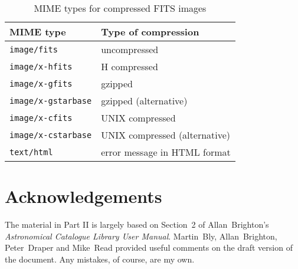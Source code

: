 \documentclass[twoside,11pt]{article}
\renewcommand{\_}{\texttt{\symbol{95}}}
\begin{document}
\begin{table}[htbp]

\begin{center}
\begin{tabular}{ll}
MIME type                & Type of compression   \\ \hline
{\tt image/fits}         & uncompressed          \\
{\tt image/x-hfits}      & H compressed          \\
{\tt image/x-gfits}      & gzipped               \\
{\tt image/x-gstarbase}  & gzipped (alternative) \\
{\tt image/x-cfits}      & UNIX compressed       \\
{\tt image/x-cstarbase}  & UNIX compressed (alternative)  \\
{\tt text/html}          & error message in HTML format   \\
\end{tabular}

\caption{MIME types for compressed FITS images \label{FITS_MIME} }
\end{center}

\end{table}

{}
\section*{Acknowledgements}

The material in Part II is largely based on Section~2 of Allan~Brighton's
{\it Astronomical Catalogue Library User Manual}\/\cite{BRIGHTON98}.
Martin~Bly, Allan~Brighton, Peter~Draper and Mike~Read provided useful
comments on the draft version of the document.  Any mistakes, of course,
are my own.




% 
\end{document}
